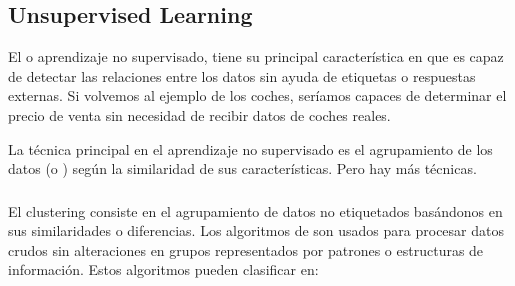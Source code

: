 

\subsection{Unsupervised Learning}

El  o  aprendizaje no supervisado, tiene su principal característica en que es capaz de detectar las relaciones entre los datos sin ayuda de etiquetas o respuestas externas. Si volvemos al ejemplo de los coches, seríamos capaces de determinar el precio de venta sin necesidad de recibir datos de coches reales.

La técnica principal en el aprendizaje no supervisado es el agrupamiento de los datos (o ) según la similaridad de sus características. Pero hay más técnicas.

\subsubsection{}

El clustering consiste en el agrupamiento de datos no etiquetados basándonos en sus similaridades o diferencias. Los algoritmos de  son usados para procesar datos crudos sin alteraciones en grupos representados por patrones o estructuras de información. Estos algoritmos pueden clasificar en:

